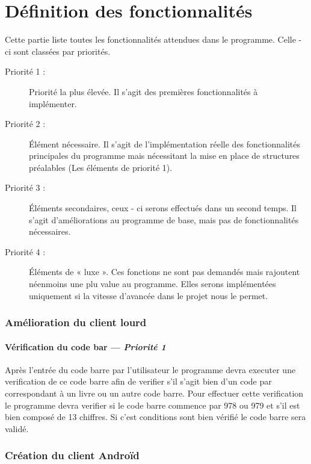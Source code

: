 \part{Définition des fonctionnalités}
Cette partie liste toutes les fonctionnalités attendues dans le programme. Celle - ci sont classées par priorités.

\begin{description}
\item [Priorité 1 :]
	Priorité la plus élevée. Il s'agit des premières fonctionnalités à implémenter.

\item [Priorité 2 :]
	Élément nécessaire. Il s'agit de l'implémentation réelle des fonctionnalités principales du programme mais nécessitant la mise en place de structures préalables (Les éléments de priorité 1). 

\item [Priorité 3 :]
	Éléments secondaires, ceux - ci serons effectués dans un second temps. Il s'agit d'améliorations au programme de base, mais pas de fonctionnalités nécessaires.  

\item [Priorité 4 :]
	Éléments de « luxe ». Ces fonctions ne sont pas demandés mais rajoutent néenmoins une plu value au programme. Elles serons implémentées uniquement si la vitesse d'avancée dans le projet nous le permet.
\end{description}


\section{Amélioration du client lourd}

\subsection[Vérification du code bar]{Vérification du code bar — \emph{Priorité 1}}
Après l'entrée du code barre par l'utilisateur le programme devra executer une verification de ce code barre afin de verifier s'il s'agit bien d'un code par correspondant à un livre ou un autre code barre. Pour effectuer cette verification le programme devra verifier si le code barre commence par 978 ou 979 et s'il est bien composé de 13 chiffres. Si c'est conditions sont bien vérifié le code barre sera validé. 




\section{Création du client Androïd}





